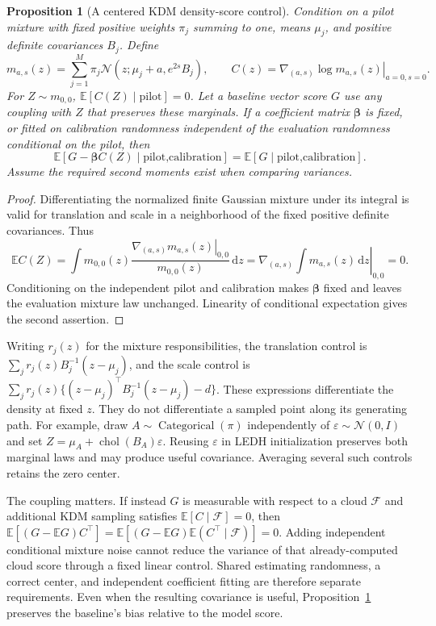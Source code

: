 \documentclass[11pt]{article}
\newtheorem{proposition}{Proposition}
\newcommand{\dd}{\mathrm{d}}
\begin{document}
\begin{proposition}[A centered KDM density-score control]
\label{prop:kdm-density-control}
Condition on a pilot mixture with fixed positive weights $\pi_j$ summing
to one, means $\mu_j$, and positive definite covariances $B_j$. Define
\begin{equation}
 m_{a,s}(z)=\sum_{j=1}^M\pi_j
   \mathcal N(z;\mu_j+a,e^{2s}B_j),\qquad
 C(z)=\left.\nabla_{(a,s)}\log m_{a,s}(z)\right|_{a=0,s=0}.
 \label{eq:kdm-density-control}
\end{equation}
For $Z\sim m_{0,0}$, $\mathbb E[C(Z)\mid\text{pilot}]=0$.
Let a baseline vector score $G$ use any coupling with $Z$ that preserves
these marginals. If a coefficient matrix $\boldsymbol{\beta}$ is fixed, or fitted on
calibration randomness independent of the evaluation randomness conditional
on the pilot, then
\begin{equation}
 \mathbb E[G-\boldsymbol{\beta} C(Z)\mid\text{pilot,calibration}]
 =\mathbb E[G\mid\text{pilot,calibration}].
\end{equation}
Assume the required second moments exist when comparing variances.
\end{proposition}
\begin{proof}
Differentiating the normalized finite Gaussian mixture under its integral
is valid for translation and scale in a neighborhood of the fixed positive
definite covariances. Thus
\[
 \mathbb E C(Z)=\int m_{0,0}(z)
  \frac{\left.\nabla_{(a,s)}m_{a,s}(z)\right|_{0,0}}{m_{0,0}(z)}\,\dd z
  =\left.\nabla_{(a,s)}\int m_{a,s}(z)\,\dd z\right|_{0,0}=0.
\]
Conditioning on the independent pilot and calibration makes $\boldsymbol{\beta}$ fixed
and leaves the evaluation mixture law unchanged. Linearity of conditional
expectation gives the second assertion.
\end{proof}

Writing $r_j(z)$ for the mixture responsibilities, the translation control
is $\sum_j r_j(z)B_j^{-1}(z-\mu_j)$, and the scale control is
$\sum_jr_j(z)\{(z-\mu_j)^\top B_j^{-1}(z-\mu_j)-d\}$.
These expressions differentiate the density at fixed $z$. They do not
differentiate a sampled point along its generating path. For example, draw
$A\sim\operatorname{Categorical}(\pi)$ independently of
$\varepsilon\sim\mathcal N(0,I)$ and set
$Z=\mu_A+\operatorname{chol}(B_A)\varepsilon$. Reusing $\varepsilon$ in
LEDH initialization preserves both marginal laws and may produce useful
covariance. Averaging several such controls retains the zero center.

The coupling matters. If instead $G$ is measurable with respect to a cloud
$\mathcal F$ and additional KDM sampling satisfies
$\mathbb E[C\mid\mathcal F]=0$, then
$\mathbb E[(G-\mathbb EG)C^\top]
=\mathbb E[(G-\mathbb EG)\mathbb E(C^\top\mid\mathcal F)]=0$.
Adding independent conditional mixture noise cannot reduce the variance of
that already-computed cloud score through a fixed linear control. Shared
estimating randomness, a correct center, and independent coefficient fitting
are therefore separate requirements. Even when the resulting covariance is
useful, Proposition~\ref{prop:kdm-density-control} preserves the baseline's
bias relative to the model score.
\end{document}
